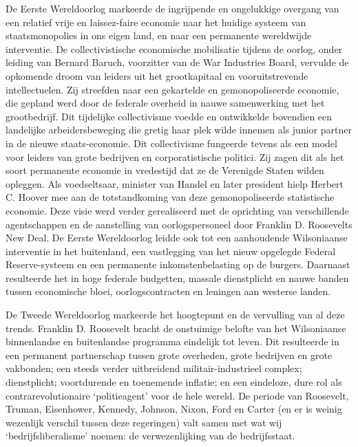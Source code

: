 \documentclass[
  a5paper,
  smalldemyvopaper,10pt,twoside,onecolumn,openright,extrafontsizes,hidelinks]{memoir}
\begin{document}
De Eerste Wereldoorlog markeerde de ingrijpende en ongelukkige overgang
van een relatief vrije en laissez-faire economie naar het huidige
systeem van staatsmonopolies in ons eigen land, en naar een permanente
wereldwijde interventie. De collectivistische economische mobilisatie
tijdens de oorlog, onder leiding van Bernard Baruch, voorzitter van de
War Industries Board, vervulde de opkomende droom van leiders uit het
grootkapitaal en vooruitstrevende intellectuelen. Zij streefden naar een
gekartelde en gemonopoliseerde economie, die gepland werd door de
federale overheid in nauwe samenwerking met het grootbedrijf. Dit
tijdelijke collectivisme voedde en ontwikkelde bovendien een landelijke
arbeidersbeweging die gretig haar plek wilde innemen als junior partner
in de nieuwe staats-economie. Dit collectivisme fungeerde tevens als een
model voor leiders van grote bedrijven en corporatistische politici. Zij
zagen dit als het soort permanente economie in vredestijd dat ze de
Verenigde Staten wilden opleggen. Als voedseltsaar, minister van Handel
en later president hielp Herbert C. Hoover mee aan de totstandkoming van
deze gemonopoliseerde statistische economie. Deze visie werd verder
gerealiseerd met de oprichting van verschillende agentschappen en de
aanstelling van oorlogspersoneel door Franklin D. Roosevelts New Deal.
De Eerste Wereldoorlog leidde ook tot een aanhoudende Wilsoniaanse
interventie in het buitenland, een vastlegging van het nieuw opgelegde
Federal Reserve-systeem en een permanente inkomstenbelasting op de
burgers. Daarnaast resulteerde het in hoge federale budgetten, massale
dienstplicht en nauwe banden tussen economische bloei, oorlogscontracten
en leningen aan westerse landen.

De Tweede Wereldoorlog markeerde het hoogtepunt en de vervulling van al
deze trends. Franklin D. Roosevelt bracht de onstuimige belofte van het
Wilsoniaanse binnenlandse en buitenlandse programma eindelijk tot leven.
Dit resulteerde in een permanent partnerschap tussen grote overheden,
grote bedrijven en grote vakbonden; een steeds verder uitbreidend
militair-industrieel complex; dienstplicht; voortdurende en toenemende
inflatie; en een eindeloze, dure rol als contrarevolutionaire
`politieagent' voor de hele wereld. De periode van Roosevelt, Truman,
Eisenhower, Kennedy, Johnson, Nixon, Ford en Carter (en er is weinig
wezenlijk verschil tussen deze regeringen) valt samen met wat wij
`bedrijfsliberalisme' noemen: de verwezenlijking van de bedrijfsstaat.
\end{document}
